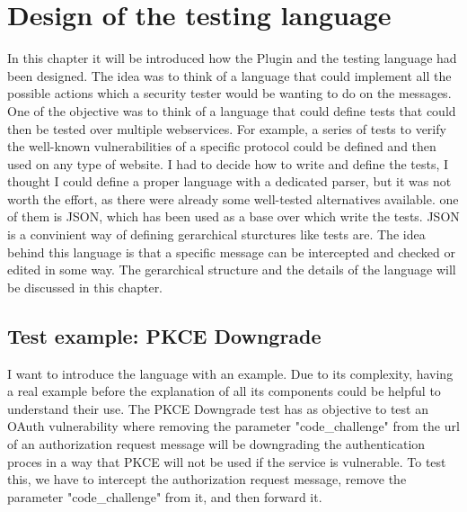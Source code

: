 \chapter{Design of the testing language}
In this chapter it will be introduced how the Plugin and the testing language had been designed. The idea was to think of a language that could implement all the possible actions which a security tester would be wanting to do on the messages. One of the objective was to think of a language that could define tests that could then be tested over multiple webservices. For example, a series of tests to verify the well-known vulnerabilities of a specific protocol could be defined and then used on any type of website.
I had to decide how to write and define the tests, I thought I could define a proper language with a dedicated parser, but it was not worth the effort, as there were already some well-tested alternatives available. one of them is JSON, which has been used as a base over which write the tests. JSON is a convinient way of defining gerarchical sturctures like tests are.
The idea behind this language is that a specific message can be intercepted and checked or edited in some way.
The gerarchical structure and the details of the language will be discussed in this chapter.

\section{Test example: PKCE Downgrade}
I want to introduce the language with an example. Due to its complexity, having a real example before the explanation of all its components could be helpful to understand their use.
The PKCE Downgrade test has as objective to test an OAuth vulnerability where removing the parameter "code\_challenge" from the url of an authorization request message will be downgrading the authentication proces in a way that PKCE will not be used if the service is vulnerable. To test this, we have to intercept the authorization request message, remove the parameter "code\_challenge" from it, and then forward it.


